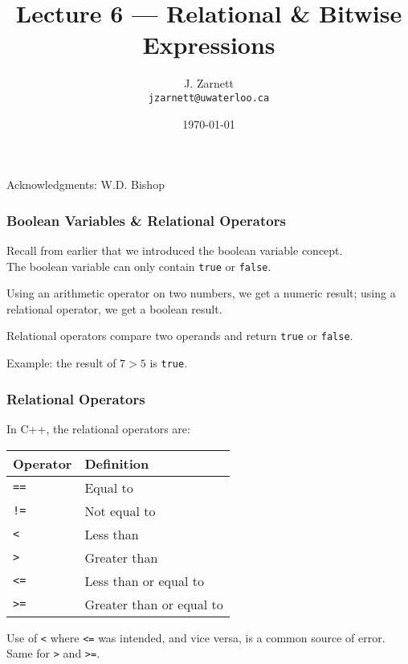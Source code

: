 

\title{Lecture 6 --- Relational \& Bitwise Expressions}

\author{J. Zarnett\\
\texttt{jzarnett@uwaterloo.ca}}
\date{\today}



\begin{frame}
  \titlepage
  
  \begin{center}
  \small{Acknowledgments: W.D. Bishop}
  \end{center}
 \end{frame}
 
\begin{frame}
\frametitle{Boolean Variables \& Relational Operators}
Recall from earlier that we introduced the boolean variable concept.\\
\quad The boolean variable can only contain \texttt{true} or \texttt{false}.

Using an arithmetic operator on two numbers, we get a numeric result; using a \alert{relational operator}, we get a boolean result.

Relational operators \alert{compare} two operands and return \texttt{true} or \texttt{false}.

Example: the result of $7 > 5$ is \texttt{true}.

\end{frame}

\begin{frame}
\frametitle{Relational Operators}

In C++, the relational operators are:

\begin{center}
\begin{tabular}{l|l}
\textbf{Operator} & \textbf{Definition} \\ \hline
	\texttt{==} & Equal to\\ \hline
	\texttt{!=} & Not equal to\\ \hline
	\texttt{\textless} & Less than \\ \hline
	\texttt{\textgreater} & Greater than \\ \hline
	\texttt{\textless=} & Less than or equal to \\ \hline
	\texttt{\textgreater=} & Greater than or equal to\\ 
\end{tabular}
\end{center}

Use of \texttt{\textless} where \texttt{\textless=} was intended, and vice versa, is a common source of error. Same for \texttt{\textgreater} and \texttt{\textgreater=}.

\end{frame}

